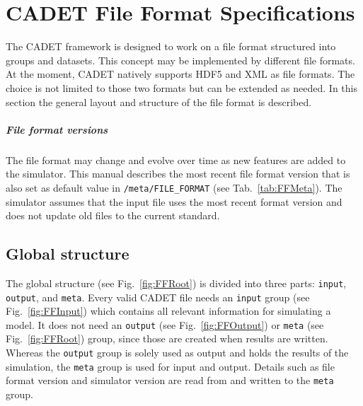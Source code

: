 %  
%  

\chapter{CADET File Format Specifications}

The CADET framework is designed to work on a file format structured into groups and datasets. This
concept may be implemented by different file formats.
At the moment, CADET natively supports HDF5 and XML as file formats.
The choice is not limited to those two formats but can be extended as needed.
In this section the general layout and structure of the file format is described.

\paragraph{File format versions}
\label{par:FFVersions}

The file format may change and evolve over time as new features are added to the simulator.
This manual describes the most recent file format version that is also set as default value in \texttt{/meta/FILE\_FORMAT} (see Tab.~\ref{tab:FFMeta}).
The simulator assumes that the input file uses the most recent format version and does not update old files to the current standard.

\section{Global structure}

The global structure (see Fig.~\ref{fig:FFRoot}) is divided into three parts: \texttt{input}, \texttt{output}, and \texttt{meta}.
Every valid CADET file needs an \texttt{input} group (see Fig.~\ref{fig:FFInput}) which contains all relevant information for simulating a model.
It does not need an \texttt{output} (see Fig.~\ref{fig:FFOutput}) or \texttt{meta} (see Fig.~\ref{fig:FFRoot}) group, since those are created when results are written.
Whereas the \texttt{output} group is solely used as output and holds the results of the simulation, the \texttt{meta} group is used for input and output.
Details such as file format version and simulator version are read from and written to the \texttt{meta} group.

